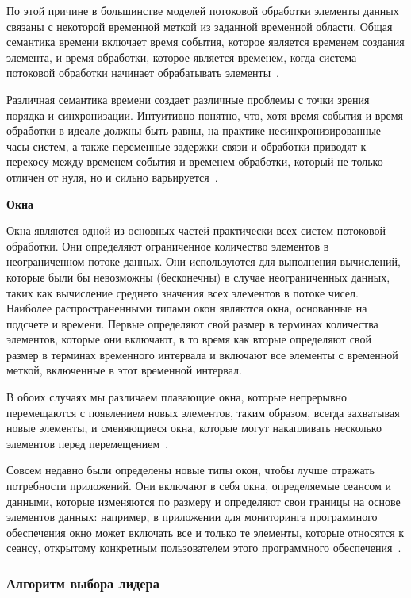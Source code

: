 По этой причине в большинстве моделей потоковой обработки элементы данных связаны с некоторой временной меткой из заданной временной области. 
Общая семантика времени включает время события, которое является временем создания элемента, и время обработки, которое является временем, когда система потоковой обработки начинает обрабатывать элементы~\cite{10.14778/2824032.2824076}.

Различная семантика времени создает различные проблемы с точки зрения порядка и синхронизации. 
Интуитивно понятно, что, хотя время события и время обработки в идеале должны быть равны, на практике несинхронизированные часы систем, а также переменные задержки связи и обработки приводят к перекосу между временем события и временем обработки, который не только отличен от нуля, но и сильно варьируется~\cite{10.14778/2824032.2824076}.

\textbf{Окна}

Окна являются одной из основных частей практически всех систем потоковой обработки. 
Они определяют ограниченное количество элементов в неограниченном потоке данных. 
Они используются для выполнения вычислений, которые были бы невозможны (бесконечны) в случае неограниченных данных, таких как вычисление среднего значения всех элементов в потоке чисел. 
Наиболее распространенными типами окон являются окна, основанные на подсчете и времени. 
Первые определяют свой размер в терминах количества элементов, которые они включают, в то время как вторые определяют свой размер в терминах временного интервала и включают все элементы с временной меткой, включенные в этот временной интервал. 

В обоих случаях мы различаем плавающие окна, которые непрерывно перемещаются с появлением новых элементов, таким образом, всегда захватывая новые элементы, и сменяющиеся окна, которые могут накапливать несколько элементов перед перемещением~\cite{10.14778/1920841.1920874}.

Совсем недавно были определены новые типы окон, чтобы лучше отражать потребности приложений. 
Они включают в себя окна, определяемые сеансом и данными, которые изменяются по размеру и определяют свои границы на основе элементов данных: 
например, в приложении для мониторинга программного обеспечения окно может включать все и только те элементы, которые относятся к сеансу, открытому конкретным пользователем этого программного обеспечения~\cite{10.14778/2824032.2824076}.

\subsubsection{Алгоритм выбора лидера}

